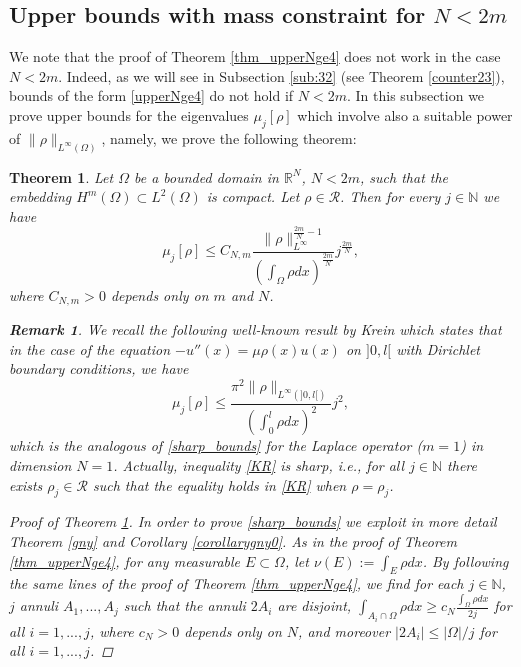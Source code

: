 \documentclass[11pt,a4paper]{amsart}
\numberwithin{equation}{section}
\newtheorem{thm}[equation]{Theorem}
\newtheorem{rem}[equation]{Remark}
\begin{document}
\subsection{Upper bounds with mass constraint for \texorpdfstring{$N<2m$}{N<2m}}\label{sub:33}

We note that the proof of Theorem \ref{thm_upperNge4} does not work in the case $N<2m$. Indeed, as we will see in Subsection \ref{sub:32} (see Theorem \ref{counter23}), bounds of the form \eqref{upperNge4} do not hold if $N<2m$. In this subsection we prove upper bounds for the eigenvalues $\mu_j[\rho]$ which involve also a suitable power of $\|\rho\|_{L^{\infty}(\Omega)}$, namely, we prove the following theorem:

\begin{thm}\label{sharpbounds_mass}
Let $\Omega$ be a bounded domain in $\mathbb R^N$, $N<2m$, such that the embedding $H^m(\Omega)\subset L^2(\Omega)$ is compact. Let $\rho\in\mathcal R$. Then for every $j\in\mathbb N$ we have
\begin{equation}\label{sharp_bounds}
\mu_j[\rho]\leq C_{N,m} \frac{\|\rho\|_{L^{\infty}}^{\frac{2m}{N}-1}}{\left(\int_{\Omega}\rho dx\right)^{\frac{2m}{N}}}j^{\frac{2m}{N}},
\end{equation}
where $C_{N,m}>0$ depends only on $m$ and $N$.

\begin{rem}\label{remKR}
We recall the following well-known result by Krein \cite{krein} which states that in the case of the equation $-u''(x)=\mu \rho(x) u(x)$ on $]0,l[$ with Dirichlet boundary conditions, we have
\begin{equation}\label{KR}
\mu_j[\rho]\leq\frac{\pi^2\|\rho\|_{L^{\infty}(]0,l[)}}{\left(\int_0^l\rho dx\right)^2}j^2,
\end{equation}
which is the analogous of \eqref{sharp_bounds} for the Laplace operator ($m=1$) in dimension $N=1$. Actually, inequality \eqref{KR} is sharp, i.e., for all $j\in\mathbb N$ there exists $\rho_j\in\mathcal R$ such that the equality holds in \eqref{KR} when $\rho=\rho_j$.
\end{rem}




\begin{proof}[Proof of Theorem \ref{sharpbounds_mass}]
In order to prove \eqref{sharp_bounds} we exploit in more detail Theorem \ref{gny} and Corollary \ref{corollarygny0}. As in the proof of Theorem \ref{thm_upperNge4}, for any measurable $E\subset\Omega$, let $\nu(E):=\int_{E}\rho dx$. By following the same lines of the proof of Theorem \ref{thm_upperNge4}, we find for each $j\in\mathbb N$, $j$ annuli $A_1,...,A_j$  such that  the annuli $2A_i$ are disjoint, $\int_{A_i\cap\Omega}\rho dx\geq c_N\frac{\int_{\Omega}\rho dx}{2j}$ for all $i=1,...,j$, where $c_N>0$ depends only on $N$, and moreover $|2A_i|\leq{|\Omega|}/{j}$ for all $i=1,...,j$.


\end{proof}
\end{thm}
\end{document}
